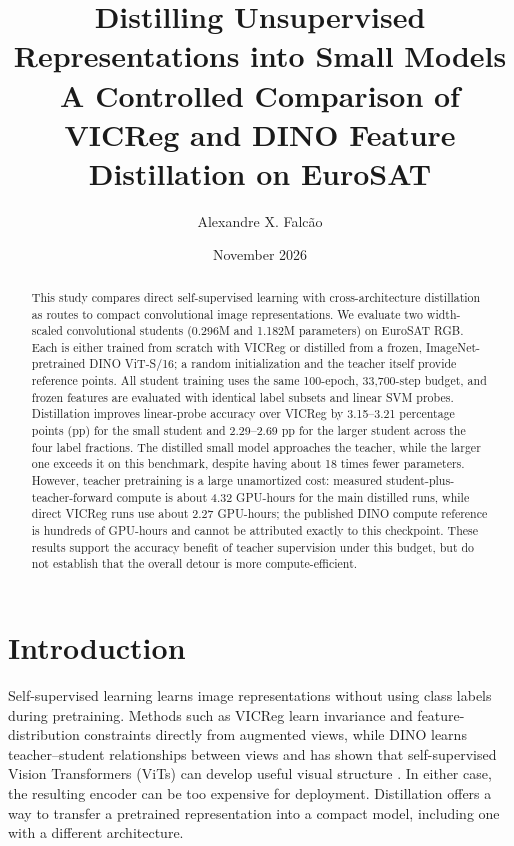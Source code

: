 \documentclass[10pt]{article}
\title{\textbf{Distilling Unsupervised Representations into Small Models}\\
\large A Controlled Comparison of VICReg and DINO Feature Distillation on EuroSAT}
\author{Alexandre X. Falc\~ao}
\date{November 2026}
\begin{document}
\maketitle

\begin{abstract}
This study compares direct self-supervised learning with cross-architecture
distillation as routes to compact convolutional image representations. We
evaluate two width-scaled convolutional students (0.296M and 1.182M
parameters) on EuroSAT RGB. Each is either trained from scratch with VICReg
or distilled from a frozen, ImageNet-pretrained DINO ViT-S/16; a random
initialization and the teacher itself provide reference points. All student
training uses the same 100-epoch, 33,700-step budget, and frozen features are
evaluated with identical label subsets and linear SVM probes. Distillation
improves linear-probe accuracy over VICReg by 3.15--3.21 percentage points
(pp) for the small student and 2.29--2.69 pp for the larger student across
the four label fractions. The distilled small model approaches the teacher,
while the larger one exceeds it on this benchmark, despite having about
18 times fewer parameters. However, teacher pretraining is a large
unamortized cost: measured student-plus-teacher-forward compute is about
4.32 GPU-hours for the main distilled runs, while direct VICReg runs use
about 2.27 GPU-hours; the published DINO compute reference is hundreds of
GPU-hours and cannot be attributed exactly to this checkpoint. These
results support the accuracy benefit of teacher supervision under this
budget, but do not establish that the overall detour is more compute-efficient.
\end{abstract}

\section{Introduction}

Self-supervised learning learns image representations without using class
labels during pretraining. Methods such as VICReg learn invariance and
feature-distribution constraints directly from augmented views, while DINO
learns teacher--student relationships between views and has shown that
self-supervised Vision Transformers (ViTs) can develop useful visual
structure \cite{vicreg,dino}. In either case, the resulting encoder can be
too expensive for deployment. Distillation offers a way to transfer a
pretrained representation into a compact model, including one with a
different architecture.
\end{document}
